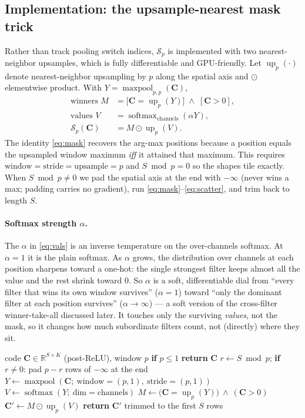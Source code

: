 \documentclass[11pt]{article}
\newcommand{\R}{\mathbb{R}}
\newcommand{\code}{\mathbf{C}}
\newcommand{\softmax}{\operatorname{softmax}}
\newcommand{\maxpool}{\operatorname{maxpool}}
\newcommand{\upnn}{\operatorname{up}}
\begin{document}
\subsection{Implementation: the upsample-nearest mask trick}
Rather than track pooling switch indices, $\mathcal{S}_p$ is implemented with two
nearest-neighbor upsamples, which is fully differentiable and GPU-friendly. Let
$\upnn_p(\cdot)$ denote nearest-neighbor upsampling by $p$ along the spatial axis and
$\odot$ elementwise product. With $Y = \maxpool_{p,p}(\code)$,
\begin{align}
\text{winners } M &= \big[\code = \upnn_p(Y)\big] \;\wedge\; [\code > 0], \label{eq:mask}\\
\text{values } V &= \softmax_{\text{channels}}(\alpha Y), \label{eq:vals}\\
\mathcal{S}_p(\code) &= M \odot \upnn_p(V). \label{eq:scatter}
\end{align}
The identity \eqref{eq:mask} recovers the arg-max positions because a position equals the
upsampled window maximum \emph{iff} it attained that maximum. This requires
$\text{window}=\text{stride}=\text{upsample}=p$ and $S \bmod p = 0$ so the shapes tile
exactly. When $S \bmod p \ne 0$ we pad the spatial axis at the end with $-\infty$
(never wins a max; padding carries no gradient), run \eqref{eq:mask}--\eqref{eq:scatter},
and trim back to length $S$.

\paragraph{Softmax strength $\alpha$.} The $\alpha$ in \eqref{eq:vals} is an inverse
temperature on the over-channels softmax. At $\alpha=1$ it is the plain softmax. As $\alpha$
grows, the distribution over channels at each position sharpens toward a one-hot: the single
strongest filter keeps almost all the value and the rest shrink toward $0$. So $\alpha$ is a
soft, differentiable dial from ``every filter that wins its own window survives'' ($\alpha=1$)
toward ``only the dominant filter at each position survives'' ($\alpha\to\infty$) --- a soft
version of the cross-filter winner-take-all discussed later. It touches only the surviving
\emph{values}, not the mask, so it changes how much subordinate filters count, not (directly)
where they sit.

\begin{algorithm}[t]
\caption{$\mathcal{S}_p(\code)$ --- non-overlapping sparsification (per batch, per channel broadcast)}
\label{alg:op}
\begin{algorithmic}[1]
\Require code $\code\in\R^{S\times K}$ (post-ReLU), window $p$
\State \textbf{if} $p \le 1$ \textbf{return} $\code$ 
\State $r \gets S \bmod p$; \textbf{if} $r\ne0$: pad $p-r$ rows of $-\infty$ at the end
\State $Y \gets \maxpool(\code;\ \text{window}=(p,1),\ \text{stride}=(p,1))$
\State $V \gets \softmax(Y;\ \text{dim}=\text{channels})$
\State $M \gets \big(\code = \upnn_p(Y)\big)\ \wedge\ (\code > 0)$
\State $\code' \gets M \odot \upnn_p(V)$
\State \textbf{return} $\code'$ trimmed to the first $S$ rows
\end{algorithmic}
\end{algorithm}
\end{document}
